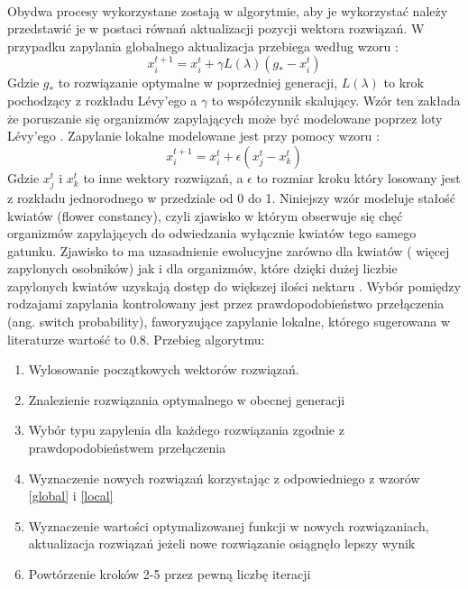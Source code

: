 \documentclass[a4paper,12pt,twoside]{article}
\begin{document}
\paragraph{}
Obydwa procesy wykorzystane zostają w algorytmie, aby je wykorzystać należy przedstawić je w postaci równań aktualizacji pozycji wektora rozwiązań. W przypadku zapylania globalnego aktualizacja przebiega według wzoru \cite{FPA}:
\begin{equation}
x^{t+1}_i=x^t_i + \gamma L(\lambda)(g_*-x^t_i)\label{global}
\end{equation}
Gdzie $g_*$ to rozwiązanie optymalne w poprzedniej generacji, $L(\lambda)$ to krok pochodzący z rozkładu Lévy'ego a  $\gamma$ to współczynnik skalujący. Wzór ten zakłada że poruszanie się organizmów zapylających może być modelowane poprzez loty Lévy'ego \cite{FPA}. 
Zapylanie lokalne modelowane jest przy pomocy wzoru \cite{FPA}:
\begin{equation}
x^{t+1}_i=x^t_i + \epsilon(x^t_j - x^t_k)\label{local}
\end{equation}
Gdzie $x^t_j$ i $x^t_k$ to inne wektory rozwiązań, a $\epsilon$ to rozmiar kroku który losowany jest z rozkładu jednorodnego w przedziale od 0 do 1. Niniejszy wzór modeluje stałość kwiatów (flower constancy), czyli zjawisko  w którym obserwuje się chęć organizmów zapylających do odwiedzania wyłącznie kwiatów tego samego gatunku. Zjawisko to ma uzasadnienie ewolucyjne zarówno dla kwiatów ( więcej zapylonych osobników) jak i dla organizmów, które dzięki dużej liczbie zapylonych kwiatów uzyskają dostęp do większej ilości nektaru \cite{FPA}. 
Wybór pomiędzy rodzajami zapylania kontrolowany jest przez prawdopodobieństwo przełączenia (ang. switch probability), faworyzujące zapylanie lokalne, którego sugerowana w literaturze wartość to 0.8. 
Przebieg algorytmu:
\begin{enumerate}
\item Wylosowanie początkowych wektorów rozwiązań.
\item Znalezienie rozwiązania optymalnego w obecnej generacji
\item Wybór typu zapylenia dla każdego rozwiązania zgodnie z prawdopodobieństwem przełączenia
\item Wyznaczenie nowych rozwiązań korzystając z odpowiedniego z wzorów \ref{global} i \ref{local} 
\item Wyznaczenie wartości optymalizowanej funkcji w nowych rozwiązaniach, aktualizacja rozwiązań jeżeli nowe rozwiązanie osiągnęło lepszy wynik
\item Powtórzenie kroków 2-5 przez pewną liczbę iteracji
\end{enumerate}
\newpage
\thispagestyle{empty}
\mbox{}
\end{document}

